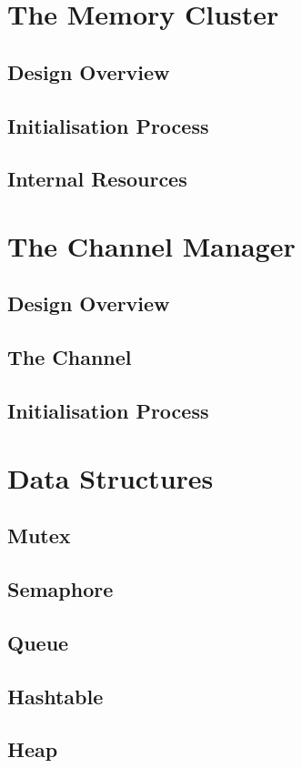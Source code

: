 \documentclass[12pt,a4paper]{article}
\begin{document}
\section{The Memory Cluster}

\subsection{Design Overview}
\subsection{Initialisation Process}
\subsection{Internal Resources}

\section{The Channel Manager}
\subsection{Design Overview}
\subsection{The Channel}
\subsection{Initialisation Process}

\section{Data Structures}
\subsection{Mutex}
\subsection{Semaphore}
\subsection{Queue}
\subsection{Hashtable}
\subsection{Heap}
\end{document}
